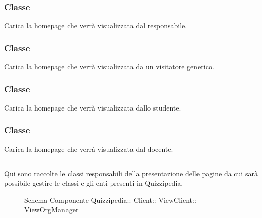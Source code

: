 \subsubsection{Classe }
Carica la homepage che verrà visualizzata dal responsabile.
\begin{itemize}
\end{itemize}
\subsubsection{Classe }
Carica la homepage che verrà visualizzata da un visitatore generico.
\begin{itemize}
\end{itemize}
\subsubsection{Classe }
Carica la homepage che verrà visualizzata dallo studente.
\begin{itemize}
\end{itemize}
\subsubsection{Classe }
Carica la homepage che verrà visualizzata dal docente.
\begin{itemize}
\end{itemize}
\subsection{}
Qui sono raccolte le classi responsabili della presentazione delle pagine da cui sarà possibile gestire le classi e gli enti presenti in Quizzipedia.
\begin{figure}[H]
\centering
\noindent{}
\caption[Schema Componente ViewOrgManager]{Schema Componente Quizzipedia:: Client:: ViewClient:: ViewOrgManager}
\end{figure}
